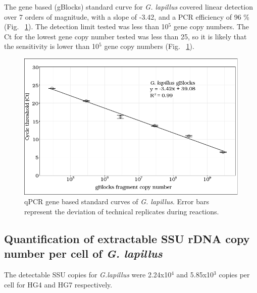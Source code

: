\documentclass[12pt]{article}
\begin{document}
The gene based (gBlocks) standard curve for \emph{G. lapillus} covered linear detection over 7 orders of magnitude, with a slope of -3.42, and a PCR efficiency of 96 \% (Fig. ~\ref{fig:lapigblocks}). 
The detection limit tested was less than 10$^{5}$ gene copy numbers. 
The Ct for the lowest gene copy number tested was less than 25, so it is likely that the sensitivity is lower than 10$^{5}$ gene copy numbers (Fig. ~\ref{fig:lapigblocks}).\\
\begin{figure}
\includegraphics[scale=.8]{Hero_qpcr-figs/Fig3_gblocks-standards.png}
\caption{qPCR gene based standard curves of \emph{G. lapillus}. Error bars represent the deviation of technical replicates during reactions.}%
\label{fig:lapigblocks}
\end{figure}
\FloatBarrier

\FloatBarrier

\subsection*{Quantification of extractable SSU rDNA copy number per cell of \emph{G. lapillus}}%
The detectable SSU copies for \emph{G.lapillus} were 2.24x10$^{4}$ and 5.85x10$^{3}$ copies per cell for HG4 and HG7 respectively. 
\end{document}
